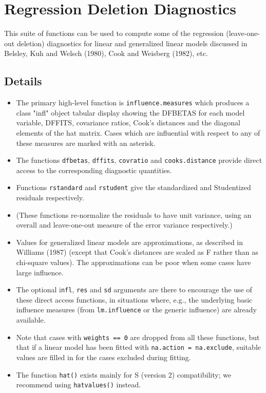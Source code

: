 \documentclass[residuals.tex]{subfiles}
\begin{document}
\Large

\section{Regression Deletion Diagnostics}

This suite of functions can be used to compute some of the regression (leave-one-out deletion) diagnostics for linear and generalized linear models discussed in Belsley, Kuh and Welsch (1980), Cook and Weisberg (1982), etc.

\subsection*{Details}
\begin{itemize}
	\item The primary high-level function is \texttt{influence.measures} which produces a class "infl" object tabular display showing the DFBETAS for each model variable, DFFITS, covariance ratios, Cook's distances and the diagonal elements of the hat matrix. Cases which are influential with respect to any of these measures are marked with an asterisk. 
	
	\item The functions \texttt{dfbetas}, \texttt{dffits}, \texttt{covratio} and \texttt{cooks.distance} provide direct access to the corresponding diagnostic quantities. 
	
	\item Functions \texttt{rstandard} and \texttt{rstudent} give the standardized and Studentized residuals respectively. 
	
	\item (These functions re-normalize the residuals to have unit variance, using an overall and leave-one-out measure of the error variance respectively.) 
	
	\item Values for generalized linear models are approximations, as described in Williams (1987) (except that Cook's distances are scaled as F rather than as chi-square values). The approximations can be poor when some cases have large influence. 
	
	\item The optional i\texttt{nfl}, \texttt{res} and \texttt{sd} arguments are there to encourage the use of these direct access functions, in situations where, e.g., the underlying basic influence measures (from \texttt{lm.influence} or the generic influence) are already available. 
	
	\item Note that cases with \texttt{weights == 0} are dropped from all these functions, but that if a linear model has been fitted with \texttt{na.action = na.exclude}, suitable values are filled in for the cases excluded during fitting. 
	
	\item 
	The function \texttt{hat()} exists mainly for S (version 2) compatibility; we recommend using \texttt{hatvalues()} instead. 
\end{itemize}
 
\end{document}
